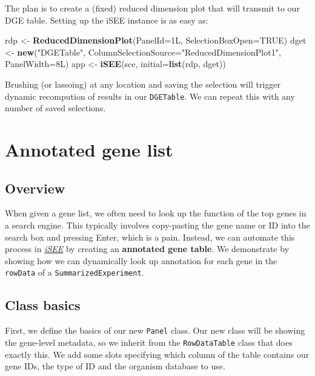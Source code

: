 \documentclass[
]{book}
\newenvironment{Shaded}{\begin{snugshade}}{\end{snugshade}}
\newcommand{\DataTypeTok}[1]{\textcolor[rgb]{0.13,0.29,0.53}{#1}}
\newcommand{\KeywordTok}[1]{\textcolor[rgb]{0.13,0.29,0.53}{\textbf{#1}}}
\newcommand{\NormalTok}[1]{#1}
\newcommand{\OtherTok}[1]{\textcolor[rgb]{0.56,0.35,0.01}{#1}}
\newcommand{\StringTok}[1]{\textcolor[rgb]{0.31,0.60,0.02}{#1}}
\begin{document}
The plan is to create a (fixed) reduced dimension plot that will transmit to our DGE table.
Setting up the iSEE instance is as easy as:

\begin{Shaded}
\begin{Highlighting}[]
\NormalTok{rdp <-}\StringTok{ }\KeywordTok{ReducedDimensionPlot}\NormalTok{(}\DataTypeTok{PanelId=}\NormalTok{1L, }\DataTypeTok{SelectionBoxOpen=}\OtherTok{TRUE}\NormalTok{)}
\NormalTok{dget <-}\StringTok{ }\KeywordTok{new}\NormalTok{(}\StringTok{"DGETable"}\NormalTok{, }\DataTypeTok{ColumnSelectionSource=}\StringTok{"ReducedDimensionPlot1"}\NormalTok{, }\DataTypeTok{PanelWidth=}\NormalTok{8L)}
\NormalTok{app <-}\StringTok{ }\KeywordTok{iSEE}\NormalTok{(sce, }\DataTypeTok{initial=}\KeywordTok{list}\NormalTok{(rdp, dget))}
\end{Highlighting}
\end{Shaded}

Brushing (or lassoing) at any location and saving the selection will trigger dynamic recompution of results in our \texttt{DGETable}.
We can repeat this with any number of saved selections.

\hypertarget{annotated-gene-list}{%
\chapter{Annotated gene list}\label{annotated-gene-list}}

\hypertarget{overview}{%
\section{Overview}\label{overview}}

When given a gene list, we often need to look up the function of the top genes in a search engine.
This typically involves copy-pasting the gene name or ID into the search box and pressing Enter, which is a pain.
Instead, we can automate this process in \emph{\href{https://bioconductor.org/packages/3.11/iSEE}{iSEE}} by creating an \textbf{annotated gene table}.
We demonstrate by showing how we can dynamically look up annotation for each gene in the \texttt{rowData} of a \texttt{SummarizedExperiment}.

\hypertarget{class-basics}{%
\section{Class basics}\label{class-basics}}

First, we define the basics of our new \texttt{Panel} class.
Our new class will be showing the gene-level metadata, so we inherit from the \texttt{RowDataTable} class that does exactly this.
We add some slots specifying which column of the table contains our gene IDs, the type of ID and the organism database to use.
\end{document}

